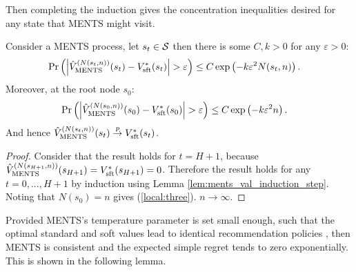            
        
        Then completing the induction gives the concentration inequalities desired for any state that MENTS might visit.
        \begin{theorem} \label{thrm:ments_val_converge}
            Consider a MENTS process, let $s_t\in\mathcal{S}$ then there is some $C,k>0$ for any $\varepsilon>0$:
            \begin{align}
                \Pr\left(\left| {\hat{V}^{(N(s_{t},n))}_{{\textnormal{MENTS}}}}(s_{t}) - V_{{\textnormal{sft}}}^*(s_{t}) \right| > \varepsilon \right) 
                    &\leq C\exp\left( -k\varepsilon^2 N(s_{t},n) \right).
            \end{align}
            Moreover, at the root node $s_0$:
            \begin{align}
                \Pr\left(\left| {\hat{V}^{(N(s_{0},n))}_{{\textnormal{MENTS}}}}(s_{0}) - V_{{\textnormal{sft}}}^*(s_{0}) \right| > \varepsilon \right) 
                    &\leq C\exp\left( -k\varepsilon^2 n \right). \label{local:three}
            \end{align}
            And hence ${\hat{V}^{(N(s_{t},n))}_{{\textnormal{MENTS}}}}(s_{t}) \overset{p}{\to} V_{{\textnormal{sft}}}^*(s_{t})$.
        \end{theorem}
        \begin{proof}
            Consider that the result holds for $t=H+1$, because ${\hat{V}^{(N(s_{H+1},n))}_{{\textnormal{MENTS}}}}(s_{H+1})=V_{{\textnormal{sft}}}^*(s_{H+1})=0$. Therefore the result holds for any $t=0,...,H+1$ by induction using Lemma \ref{lem:ments_val_induction_step}. Noting that $N(s_0)=n$ gives (\ref{local:three}). $n\rightarrow\infty$. 
        \end{proof}










        Provided MENTS's temperature parameter is set small enough, such that the optimal standard and soft values lead to identical recommendation policies , then MENTS is consistent and the expected simple regret tends to zero exponentially. This is shown in the following lemma.
            
